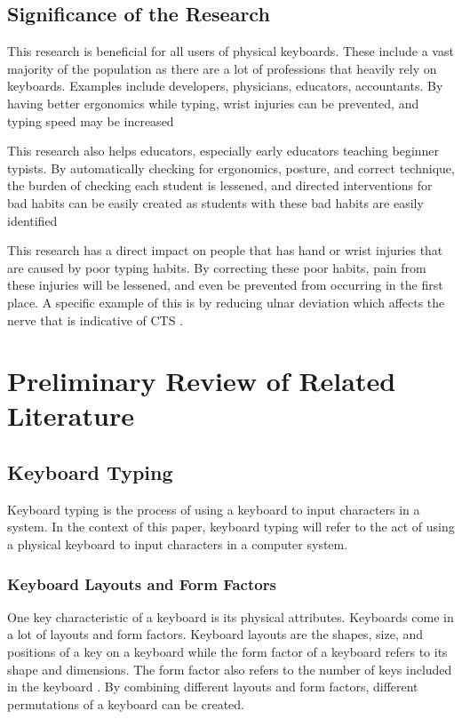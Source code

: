 \documentclass{report}
\begin{document}
\section{Significance of the Research}
This research is beneficial for all users of physical keyboards. These include a
vast majority of the population as there are a lot of professions that heavily
rely on keyboards. Examples include developers, physicians, educators,
accountants. By having better ergonomics while typing, wrist injuries can be
prevented, and typing speed may be increased

This research also helps educators, especially early educators teaching beginner
typists. By automatically checking for ergonomics, posture, and correct
technique, the burden of checking each student is lessened, and directed
interventions for bad habits can be easily created as students with these bad
habits are easily identified

This research has a direct impact on people that has hand or wrist injuries that
are caused by poor typing habits. By correcting these poor habits, pain from
these injuries will be lessened, and even be prevented from occurring in the
first place. A specific example of this is by reducing ulnar deviation which
affects the nerve that is indicative of CTS \parencite{toosi2015}.

\chapter{Preliminary Review of Related Literature}

\section{Keyboard Typing}

Keyboard typing is the process of using a keyboard to input characters in a
system. In the context of this paper, keyboard typing will refer to the act of
using a physical keyboard to input characters in a computer system.


\subsection{Keyboard Layouts and Form Factors}

One key characteristic of a keyboard is its physical attributes. Keyboards come
in a lot of layouts and form factors. Keyboard layouts are the shapes, size, and
positions of a key on a keyboard while the form factor of a keyboard refers to
its shape and dimensions. The form factor also refers to the number of keys included
in the keyboard \parencite{parkkinen2018}. By combining different layouts and
form factors, different permutations of a keyboard can be created.
\end{document}
